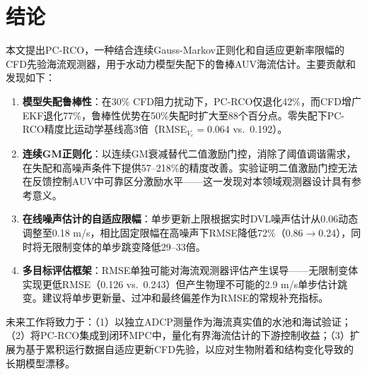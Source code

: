 \section{结论}

本文提出PC-RCO，一种结合连续Gauss-Markov正则化和自适应更新率限幅的CFD先验海流观测器，用于水动力模型失配下的鲁棒AUV海流估计。主要贡献和发现如下：

\begin{enumerate}[itemsep=0pt,topsep=4pt]
    \item \textbf{模型失配鲁棒性}：在30\% CFD阻力扰动下，PC-RCO仅退化42\%，而CFD增广EKF退化77\%，鲁棒性优势在50\%失配时扩大至88个百分点。零失配下PC-RCO精度比运动学基线高3倍（RMSE$_{V_c}=0.064$ vs.\ 0.192）。

    \item \textbf{连续GM正则化}：以连续GM衰减替代二值激励门控，消除了阈值调谐需求，在失配和高噪声条件下提供57--218\%的精度改善。实验证明二值激励门控无法在反馈控制AUV中可靠区分激励水平——这一发现对本领域观测器设计具有参考意义。

    \item \textbf{在线噪声估计的自适应限幅}：单步更新上限根据实时DVL噪声估计从0.06动态调整至0.18 m/s，相比固定限幅在高噪声下RMSE降低72\%（0.86$\rightarrow$0.24），同时将无限制变体的单步跳变降低29--33倍。

    \item \textbf{多目标评估框架}：RMSE单独可能对海流观测器评估产生误导——无限制变体实现更低RMSE（0.126 vs.\ 0.243）但产生物理不可能的2.9 m/s单步估计跳变。建议将单步更新量、过冲和最终偏差作为RMSE的常规补充指标。
\end{enumerate}

未来工作将致力于：（1）以独立ADCP测量作为海流真实值的水池和海试验证；（2）将PC-RCO集成到闭环MPC中，量化有界海流估计的下游控制收益；（3）扩展为基于累积运行数据自适应更新CFD先验，以应对生物附着和结构变化导致的长期模型漂移。

